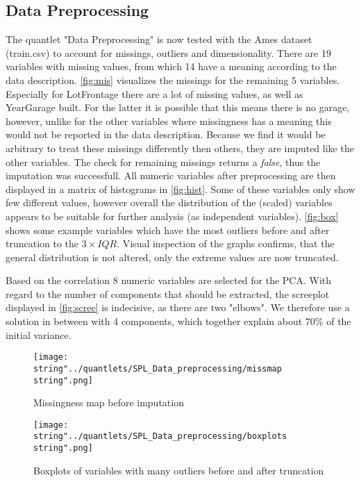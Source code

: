 
\subsection{Data Preprocessing}
The quantlet "Data Preprocessing" is now tested with the Ames dataset (train.csv) to account for missings, outliers and dimensionality. 
There are 19 variables with missing values, from which 14 have a meaning according to the data description. 
\autoref{fig:mis} visualizes the missings for the remaining 5 variables. Especially for LotFrontage there are a lot of missing values, as well as YearGarage built. For the latter it is possible that this means there is no garage, however, unlike for the other variables where missingness has a meaning this would not be reported in the data description. Because we find it would be arbitrary to treat these missings differently then others, they are imputed like the other variables.
The check for remaining missings returns a \textit{false}, thus the imputation was successfull. 
All numeric variables after preprocessing are then displayed in a matrix of  histograms in \autoref{fig:hist}. Some of these variables only show few different values, however overall the distribution of the (scaled) variables appears to be suitable for further analysis (as independent variables). 
\autoref{fig:box} shows some example variables which have the most outliers before and after truncation to the $3 \times IQR$. Visual inspection of the graphs confirms, that the general distribution is not altered, only the extreme values are now truncated. 


Based on the correlation 8 numeric variables are selected for the PCA. With regard to the number of components that should be extracted, the screeplot displayed in \autoref{fig:scree} is indecisive, as there are two "elbows".  We therefore use a solution in between with 4 components, which together explain about 70\% of the initial variance. 



\begin{figure}[H]
  \centering
\texttt{[image: \\string"../quantlets/SPL\_Data\_preprocessing/missmap\\string".png]}
  \caption{Missingness map before imputation}\label{fig:mis}
\end{figure}
 
\begin{figure}[H]
  \centering
\texttt{[image: \\string"../quantlets/SPL\_Data\_preprocessing/boxplots\\string".png]}
  \caption{Boxplots of variables with many outliers before and after truncation}\label{fig:box}
\end{figure}

